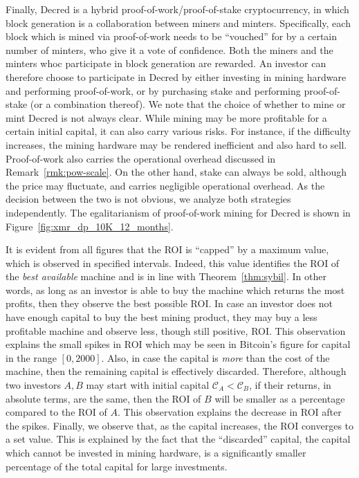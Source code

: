 Finally, Decred is a hybrid proof-of-work/proof-of-stake cryptocurrency, in
which block generation is a collaboration between miners and minters.
Specifically, each block which is mined via proof-of-work needs to be
``vouched'' for by a certain number of minters, who give it a vote of
confidence. Both the miners and the minters whoc participate in block
generation are rewarded. An investor can therefore choose to participate in
Decred by either investing in mining hardware and performing proof-of-work, or
by purchasing stake and performing proof-of-stake (or a combination thereof).
We note that the choice of whether to mine or mint Decred is not always clear.
While mining may be more profitable for a certain initial capital, it can also
carry various risks. For instance, if the difficulty increases, the mining
hardware may be rendered inefficient and also hard to sell. Proof-of-work also
carries the operational overhead discussed in Remark~\ref{rmk:pow-scale}. On
the other hand, stake can always be sold, although the price may fluctuate, and
carries negligible operational overhead. As the decision between the two is not
obvious, we analyze both strategies independently. The egalitarianism of
proof-of-work mining for Decred is shown in
Figure~\ref{fig:xmr_dp_10K_12_months}.

It is evident from all figures that the ROI is ``capped'' by a maximum value,
which is observed in specified intervals. Indeed, this value identifies the
ROI of the \emph{best available} machine and is in line with Theorem~\ref{thm:sybil}. In other words, as long as an
investor is able to buy the machine which returns the most profits, then they
observe the best possible ROI. In case an investor does not have enough capital
to buy the best mining product, they may buy a less profitable machine and
observe less, though still positive, ROI. This observation explains the small
spikes in ROI which may be seen \eg in Bitcoin's figure for capital in the
range $[0, 2000]$. Also, in case the capital is \emph{more} than the cost of
the machine, then the remaining capital is effectively discarded. Therefore,
although two investors $A, B$ may start with initial capital $\mathcal{C}_A <
\mathcal{C}_B$, if their returns, in absolute terms, are the same, then the ROI
of $B$ will be smaller as a percentage compared to the ROI of $A$. This
observation explains the decrease in ROI after the spikes. Finally, we observe
that, as the capital increases, the ROI converges to a set value. This is
explained by the fact that the ``discarded'' capital, \ie the capital which
cannot be invested in mining hardware, is a significantly smaller percentage of
the total capital for large investments.

